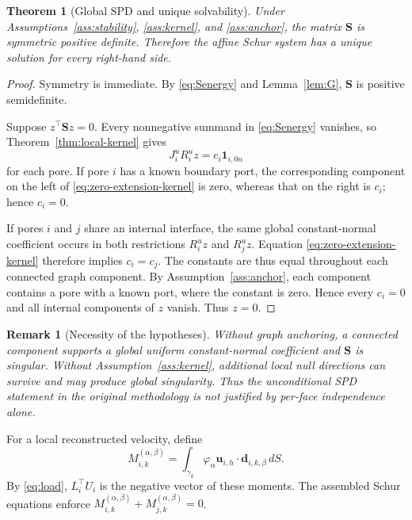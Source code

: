 \documentclass[11pt,a4paper]{article}
\newtheorem{theorem}[assumption]{Theorem}
\newtheorem{remark}[assumption]{Remark}
\newcommand{\vel}{\bm{u}}
\newcommand{\Schur}{\mathbf S}
\newcommand{\one}{\bm 1}
\begin{document}
\begin{theorem}[Global SPD and unique solvability]\label{thm:SPD}
Under Assumptions~\ref{ass:stability}, \ref{ass:kernel}, and
\ref{ass:anchor}, the matrix $\Schur$ is symmetric positive definite.
Therefore the affine Schur system has a unique solution for every right-hand
side.
\end{theorem}

\begin{proof}
Symmetry is immediate.  By \eqref{eq:Senergy} and
Lemma~\ref{lem:G}, $\Schur$ is positive semidefinite.

Suppose $z^\top\Schur z=0$.  Every nonnegative summand in
\eqref{eq:Senergy} vanishes, so Theorem~\ref{thm:local-kernel} gives
\begin{equation}\label{eq:zero-extension-kernel}
 J_i^uR_i^uz=c_i\one_{i,0n}
\end{equation}
for each pore.  If pore $i$ has a known boundary port, the corresponding
component on the left of \eqref{eq:zero-extension-kernel} is zero, whereas
that on the right is $c_i$; hence $c_i=0$.

If pores $i$ and $j$ share an internal interface, the same global
constant-normal coefficient occurs in both restrictions $R_i^uz$ and
$R_j^uz$.  Equation \eqref{eq:zero-extension-kernel} therefore implies
$c_i=c_j$.  The constants are thus equal throughout each connected graph
component.  By Assumption~\ref{ass:anchor}, each component contains a pore
with a known port, where the constant is zero.  Hence every $c_i=0$ and all
internal components of $z$ vanish.  Thus $z=0$.
\end{proof}

\begin{remark}[Necessity of the hypotheses]
Without graph anchoring, a connected component supports a global uniform
constant-normal coefficient and $\Schur$ is singular.  Without
Assumption~\ref{ass:kernel}, additional local null directions can survive and
may produce global singularity.  Thus the unconditional SPD statement in the
original methodology is not justified by per-face independence alone.
\end{remark}

For a local reconstructed velocity, define
\[
 M_{i,k}^{(\alpha,\beta)}
 =\int_{\gamma_k}\varphi_\alpha
 \vel_{i,h}\cdot\bm d_{i,k,\beta}\,dS.
\]
By \eqref{eq:load}, $L_i^\top U_i$ is the negative vector of these moments.
The assembled Schur equations enforce
$M_{i,k}^{(\alpha,\beta)}+M_{j,k}^{(\alpha,\beta)}=0$.
\end{document}

